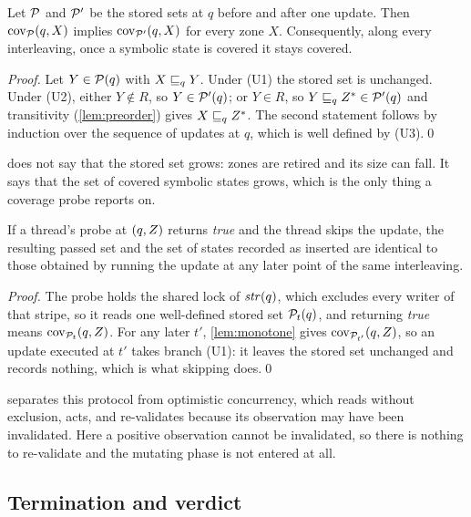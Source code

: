 \begin{lemma}\label{lem:monotone}
Let $\mathcal{P}$ and $\mathcal{P}'$ be the stored sets at $q$ before and after one
update.  Then $\mathrm{cov}_{\mathcal{P}}(q,X)$ implies $\mathrm{cov}_{\mathcal{P}'}(q,X)$
for every zone $X$.  Consequently, along every interleaving, once a symbolic
state is covered it stays covered.
\end{lemma}
\begin{proof}
Let $Y \in \mathcal{P}(q)$ with $X \sqsubseteq_q Y$.  Under (U1) the stored set is
unchanged.  Under (U2), either $Y \notin R$, so $Y \in \mathcal{P}'(q)$; or $Y \in
R$, so $Y \sqsubseteq_q Z^{*} \in \mathcal{P}'(q)$ and transitivity
(\cref{lem:preorder}) gives $X \sqsubseteq_q Z^{*}$.  The second statement follows
by induction over the sequence of updates at $q$, which is well defined by
(U3).\qed
\end{proof}

 does not say that the stored set grows: zones are retired and
its size can fall.  It says that the set of covered symbolic states grows, which
is the only thing a coverage probe reports on.

\begin{theorem}\label{thm:probe}
If a thread's probe at $(q,Z)$ returns \emph{true} and the thread skips the
update, the resulting passed set and the set of states recorded as inserted are
identical to those obtained by running the update at any later point of the same
interleaving.
\end{theorem}
\begin{proof}
The probe holds the shared lock of $\mathit{str}(q)$, which excludes every writer of
that stripe, so it reads one well-defined stored set $\mathcal{P}_t(q)$, and
returning \emph{true} means $\mathrm{cov}_{\mathcal{P}_t}(q,Z)$.  For any later
$t'$, \cref{lem:monotone} gives $\mathrm{cov}_{\mathcal{P}_{t'}}(q,Z)$, so an
update executed at $t'$ takes branch (U1): it leaves the stored set unchanged and
records nothing, which is what skipping does.\qed
\end{proof}

 separates this protocol from optimistic concurrency, which reads
without exclusion, acts, and re-validates because its observation may have been
invalidated.  Here a positive observation cannot be invalidated, so there is
nothing to re-validate and the mutating phase is not entered at all.

\subsection{Termination and verdict}

